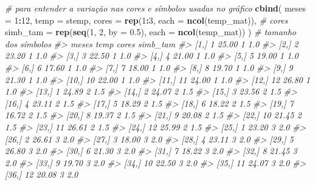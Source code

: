 \documentclass[]{book}
\newenvironment{Shaded}{\begin{snugshade}}{\end{snugshade}}
\newcommand{\KeywordTok}[1]{\textcolor[rgb]{0.13,0.29,0.53}{\textbf{#1}}}
\newcommand{\DataTypeTok}[1]{\textcolor[rgb]{0.13,0.29,0.53}{#1}}
\newcommand{\DecValTok}[1]{\textcolor[rgb]{0.00,0.00,0.81}{#1}}
\newcommand{\FloatTok}[1]{\textcolor[rgb]{0.00,0.00,0.81}{#1}}
\newcommand{\CommentTok}[1]{\textcolor[rgb]{0.56,0.35,0.01}{\textit{#1}}}
\newcommand{\OperatorTok}[1]{\textcolor[rgb]{0.81,0.36,0.00}{\textbf{#1}}}
\newcommand{\NormalTok}[1]{#1}
\begin{document}
\begin{Shaded}
\begin{Highlighting}[]
\CommentTok{# para entender a variação nas cores e símbolos usadas no gráfico}
\KeywordTok{cbind}\NormalTok{(}
  \DataTypeTok{meses =} \DecValTok{1}\OperatorTok{:}\DecValTok{12}\NormalTok{, }\DataTypeTok{temp =}\NormalTok{ stemp,}
  \DataTypeTok{cores =} \KeywordTok{rep}\NormalTok{(}\DecValTok{1}\OperatorTok{:}\DecValTok{3}\NormalTok{, }\DataTypeTok{each =} \KeywordTok{ncol}\NormalTok{(temp_mat)), }\CommentTok{# cores}
  \DataTypeTok{simb_tam =} \KeywordTok{rep}\NormalTok{(}\KeywordTok{seq}\NormalTok{(}\DecValTok{1}\NormalTok{, }\DecValTok{2}\NormalTok{, }\DataTypeTok{by =} \FloatTok{0.5}\NormalTok{), }\DataTypeTok{each =} \KeywordTok{ncol}\NormalTok{(temp_mat))}
\NormalTok{) }\CommentTok{# tamanho dos símbolos}
\CommentTok{#>       meses  temp cores simb_tam}
\CommentTok{#>  [1,]     1 25.00     1      1.0}
\CommentTok{#>  [2,]     2 23.20     1      1.0}
\CommentTok{#>  [3,]     3 22.50     1      1.0}
\CommentTok{#>  [4,]     4 21.00     1      1.0}
\CommentTok{#>  [5,]     5 19.00     1      1.0}
\CommentTok{#>  [6,]     6 17.60     1      1.0}
\CommentTok{#>  [7,]     7 18.00     1      1.0}
\CommentTok{#>  [8,]     8 19.70     1      1.0}
\CommentTok{#>  [9,]     9 21.30     1      1.0}
\CommentTok{#> [10,]    10 22.00     1      1.0}
\CommentTok{#> [11,]    11 24.00     1      1.0}
\CommentTok{#> [12,]    12 26.80     1      1.0}
\CommentTok{#> [13,]     1 24.89     2      1.5}
\CommentTok{#> [14,]     2 24.07     2      1.5}
\CommentTok{#> [15,]     3 23.56     2      1.5}
\CommentTok{#> [16,]     4 23.11     2      1.5}
\CommentTok{#> [17,]     5 18.29     2      1.5}
\CommentTok{#> [18,]     6 18.22     2      1.5}
\CommentTok{#> [19,]     7 16.72     2      1.5}
\CommentTok{#> [20,]     8 19.37     2      1.5}
\CommentTok{#> [21,]     9 20.08     2      1.5}
\CommentTok{#> [22,]    10 21.45     2      1.5}
\CommentTok{#> [23,]    11 26.61     2      1.5}
\CommentTok{#> [24,]    12 25.99     2      1.5}
\CommentTok{#> [25,]     1 23.20     3      2.0}
\CommentTok{#> [26,]     2 26.61     3      2.0}
\CommentTok{#> [27,]     3 18.00     3      2.0}
\CommentTok{#> [28,]     4 23.11     3      2.0}
\CommentTok{#> [29,]     5 26.80     3      2.0}
\CommentTok{#> [30,]     6 21.30     3      2.0}
\CommentTok{#> [31,]     7 18.22     3      2.0}
\CommentTok{#> [32,]     8 21.45     3      2.0}
\CommentTok{#> [33,]     9 19.70     3      2.0}
\CommentTok{#> [34,]    10 22.50     3      2.0}
\CommentTok{#> [35,]    11 24.07     3      2.0}
\CommentTok{#> [36,]    12 20.08     3      2.0}
\end{Highlighting}
\end{Shaded}
\end{document}

